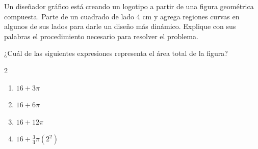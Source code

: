Un diseñador gráfico está creando un logotipo a partir de una figura geométrica compuesta. Parte de un cuadrado de lado 4 cm y agrega regiones curvas en algunos de sus lados para darle un diseño más dinámico. Explique con sus palabras el procedimiento necesario para resolver el problema.

\begin{center}
\end{center}

¿Cuál de las siguientes expresiones representa el área total de la figura?

\begin{multicols}{2}
\begin{enumerate}[label=\alph*), leftmargin=*]
\item $16 + 3\pi$
\item $16 + 6\pi$
\item $16 + 12\pi$
\item $16 + \frac{3}{4}\pi(2^2)$
\end{enumerate}
\end{multicols}
